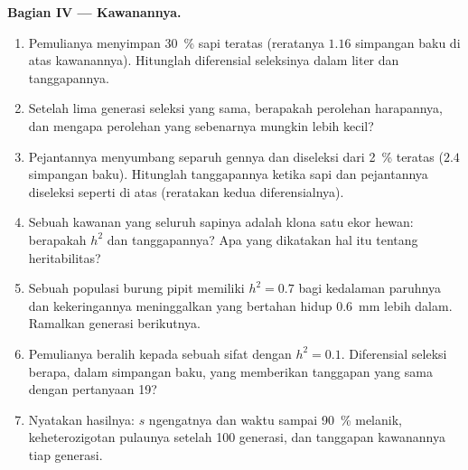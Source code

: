 \begin{problem}
\medskip
\noindent\textbf{Bagian IV --- Kawanannya.}
\begin{enumerate}[resume]
  \item Pemulianya menyimpan \qty{30}{\%} sapi teratas (reratanya
        $1.16$ simpangan baku di atas kawanannya). Hitunglah
        diferensial seleksinya dalam liter dan tanggapannya.
  \item Setelah lima generasi seleksi yang sama, berapakah perolehan
        harapannya, dan mengapa perolehan yang sebenarnya mungkin lebih
        kecil?
  \item Pejantannya menyumbang separuh gennya dan diseleksi dari
        \qty{2}{\%} teratas ($2.4$ simpangan baku). Hitunglah
        tanggapannya ketika sapi dan pejantannya diseleksi seperti di
        atas (reratakan kedua diferensialnya).
  \item Sebuah kawanan yang seluruh sapinya adalah klona satu ekor
        hewan: berapakah $h^{2}$ dan tanggapannya? Apa yang dikatakan
        hal itu tentang heritabilitas?
  \item Sebuah populasi burung pipit memiliki $h^{2} = 0.7$ bagi
        kedalaman paruhnya dan kekeringannya meninggalkan yang bertahan
        hidup \qty{0.6}{mm} lebih dalam. Ramalkan generasi berikutnya.
  \item Pemulianya beralih kepada sebuah sifat dengan $h^{2} = 0.1$.
        Diferensial seleksi berapa, dalam simpangan baku, yang
        memberikan tanggapan yang sama dengan pertanyaan 19?
  \item Nyatakan hasilnya: $s$ ngengatnya dan waktu sampai
        \qty{90}{\%} melanik, keheterozigotan pulaunya setelah 100
        generasi, dan tanggapan kawanannya tiap generasi.
\end{enumerate}
\end{problem}
